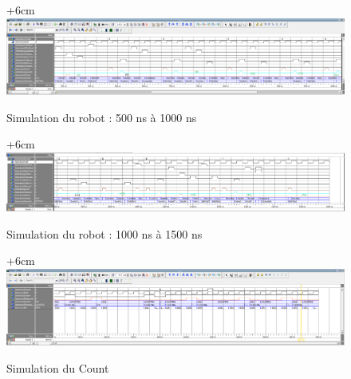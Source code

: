 \documentclass{article}
\begin{document}
\begin{figure}[h]
\advance\leftskip+6cm
\includegraphics[scale=0.50, angle=-90]{detail_part2.PNG}
\caption{Simulation du robot : 500 ns à 1000 ns}
\end{figure}

\begin{figure}[h]
\advance\leftskip+6cm
\includegraphics[scale=0.50, angle=-90]{detail_part3.PNG}
\caption{Simulation du robot : 1000 ns à 1500 ns}
\end{figure}

\begin{figure}[h]
\advance\leftskip+6cm
\includegraphics[scale=0.50, angle=-90]{count.PNG}
\caption{Simulation du Count}
\end{figure}
\end{document}
